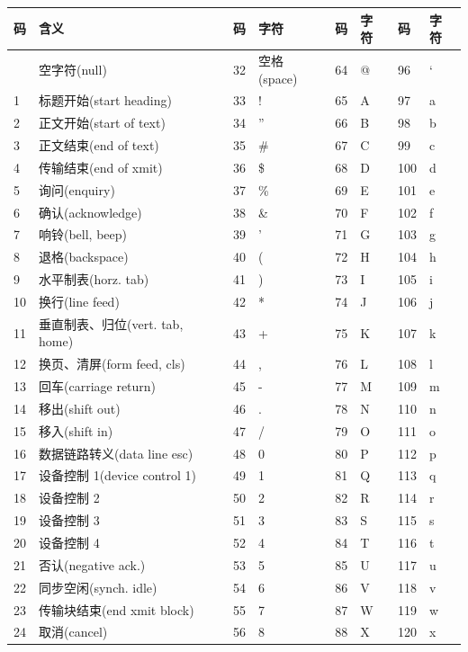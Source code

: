 {\def\LTcaptype{none} %
\begin{longtable}[]{@{}llllllll@{}}
\toprule\noalign{}
码 & 含义 & 码 & 字符 & 码 & 字符 & 码 & 字符 \\
\midrule\noalign{}
\endhead
\bottomrule\noalign{}
\endlastfoot
0 & 空字符(null) & 32 & 空格(space) & 64 & @ & 96 & ` \\
1 & 标题开始(start heading) & 33 & ! & 65 & A & 97 & a \\
2 & 正文开始(start of text) & 34 & '' & 66 & B & 98 & b \\
3 & 正文结束(end of text) & 35 & \# & 67 & C & 99 & c \\
4 & 传输结束(end of xmit) & 36 & \$ & 68 & D & 100 & d \\
5 & 询问(enquiry) & 37 & \% & 69 & E & 101 & e \\
6 & 确认(acknowledge) & 38 & \& & 70 & F & 102 & f \\
7 & 响铃(bell, beep) & 39 & ' & 71 & G & 103 & g \\
8 & 退格(backspace) & 40 & ( & 72 & H & 104 & h \\
9 & 水平制表(horz. tab) & 41 & ) & 73 & I & 105 & i \\
10 & 换行(line feed) & 42 & * & 74 & J & 106 & j \\
11 & 垂直制表、归位(vert. tab, home) & 43 & + & 75 & K & 107 & k \\
12 & 换页、清屏(form feed, cls) & 44 & , & 76 & L & 108 & l \\
13 & 回车(carriage return) & 45 & - & 77 & M & 109 & m \\
14 & 移出(shift out) & 46 & . & 78 & N & 110 & n \\
15 & 移入(shift in) & 47 & / & 79 & O & 111 & o \\
16 & 数据链路转义(data line esc) & 48 & 0 & 80 & P & 112 & p \\
17 & 设备控制 1(device control 1) & 49 & 1 & 81 & Q & 113 & q \\
18 & 设备控制 2 & 50 & 2 & 82 & R & 114 & r \\
19 & 设备控制 3 & 51 & 3 & 83 & S & 115 & s \\
20 & 设备控制 4 & 52 & 4 & 84 & T & 116 & t \\
21 & 否认(negative ack.) & 53 & 5 & 85 & U & 117 & u \\
22 & 同步空闲(synch. idle) & 54 & 6 & 86 & V & 118 & v \\
23 & 传输块结束(end xmit block) & 55 & 7 & 87 & W & 119 & w \\
24 & 取消(cancel) & 56 & 8 & 88 & X & 120 & x \\

\end{longtable}}
